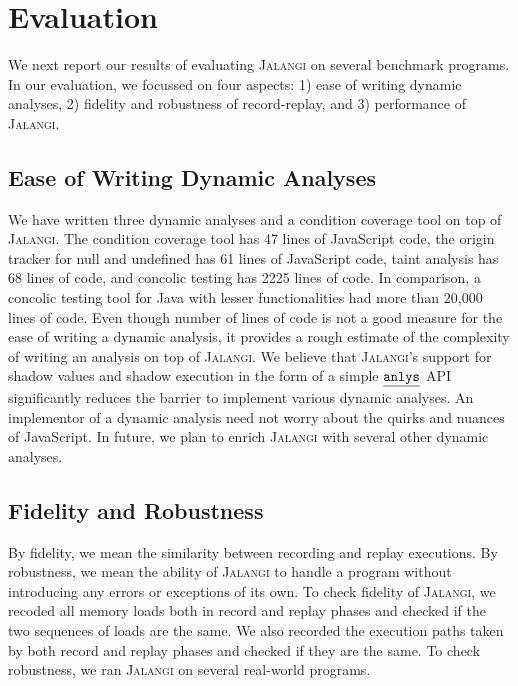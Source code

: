 \documentclass{sig-alternate}
\def\jalangi{\textsc{Jalangi}}
\newcommand \usl [1] {\mbox{\underline{\tt #1}}\xspace}
\newcommand \analysis{\usl{anlys}}
\begin{document}
\section{Evaluation}
\label{sec:evaluation}

We next report our results of evaluating \jalangi{} on several
benchmark programs.  In our evaluation, we focussed on four aspects:
1) ease of writing dynamic analyses, 2) fidelity and robustness of
record-replay, and 3) performance of \jalangi{}.

\subsection{Ease of Writing Dynamic Analyses}
\label{sec:ease-writing-dynamic}

We have written three dynamic analyses and a condition coverage tool
on top of \jalangi{}.  The condition coverage tool has 47 lines of
JavaScript code, the origin tracker for null and undefined has 61
lines of JavaScript code, taint analysis has 68 lines of code, and
concolic testing has 2225 lines of code.  In comparison, a concolic
testing tool for Java with lesser functionalities had more than 20,000
lines of code.  Even though number of lines of code is not a good
measure for the ease of writing a dynamic analysis, it provides a
rough estimate of the complexity of writing an analysis on top of
\jalangi{}.  We believe that \jalangi{}'s support for shadow values
and shadow execution in the form of a simple $\analysis$ API
significantly reduces the barrier to implement various dynamic
analyses.  An implementor of a dynamic analysis need not worry about
the quirks and nuances of JavaScript.  In future, we plan to enrich
\jalangi{} with several other dynamic analyses.

\subsection{Fidelity and Robustness}
\label{sec:fidelity-robustness}

By fidelity, we mean the similarity between recording and replay
executions.  By robustness, we mean the ability of \jalangi{} to
handle a program without introducing any errors or exceptions of its
own.  To check fidelity of \jalangi{}, we recoded all memory loads
both in record and replay phases and checked if the two sequences of
loads are the same.  We also recorded the execution paths taken by
both record and replay phases and checked if they are the same.  To
check robustness, we ran \jalangi{} on several real-world programs.
\end{document}
